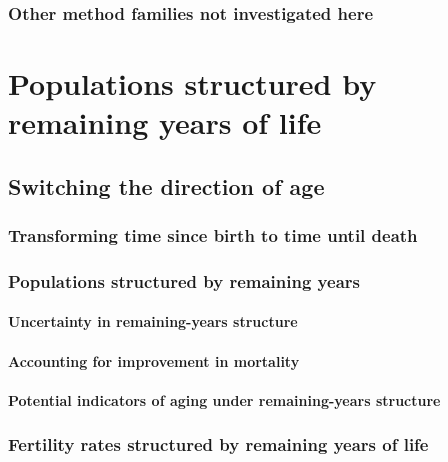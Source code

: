   \section{Other method families not investigated here}
     


\part*{Populations structured by remaining years of life}
  \chapter{Switching the direction of age}
  
  
  \section{Transforming time since birth to time until death}
    
   
  \section{Populations structured by remaining years}
    
    \subsection{Uncertainty in remaining-years structure}
      
    \subsection{Accounting for improvement in mortality}
      
    \subsection{Potential indicators of aging under remaining-years structure}
      
  \section{Fertility rates structured by remaining years of life}
    
    
